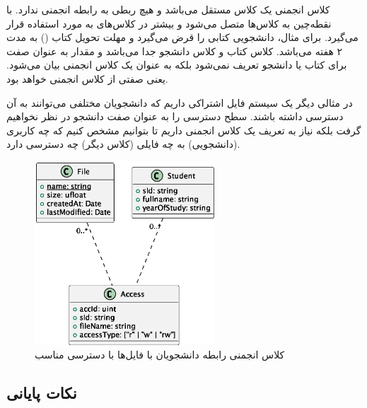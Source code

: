 کلاس انجمنی یک کلاس مستقل می‌باشد و هیچ ربطی به رابطه انجمنی ندارد. با نقطه‌چین
به کلاس‌ها متصل می‌شود و بیشتر در کلاس‌های  به  مورد استفاده قرار
می‌گیرد. برای مثال، دانشجویی کتابی را قرض می‌گیرد و مهلت تحویل کتاب () به مدت ۲ هفته می‌باشد. کلاس کتاب و کلاس دانشجو جدا می‌باشد و مقدار
 به عنوان صفت برای کتاب یا دانشجو تعریف نمی‌شود بلکه به عنوان
یک کلاس انجمنی بیان می‌شود. یعنی صفتی از کلاس انجمنی خواهد بود.

در مثالی دیگر یک سیستم فایل اشتراکی داریم که دانشجویان مختلفی می‌توانند به آن
دسترسی داشته باشند. سطح دسترسی را به عنوان صفت دانشجو در نظر نخواهیم گرفت بلکه
نیاز به تعریف یک کلاس انجمنی داریم تا بتوانیم مشخص کنیم که چه کاربری (دانشجویی)
به چه فایلی (کلاس دیگر) چه دسترسی دارد.

\begin{LTR}


\end{LTR}

\begin{figure}[H]
    \centering
    \includegraphics[width=0.6\textwidth]{assets/classes/associatedFileClass.eps}
    \caption{کلاس انجمنی رابطه دانشجویان با فایل‌ها با دسترسی مناسب}
\end{figure}

\subsection{نکات پایانی}

